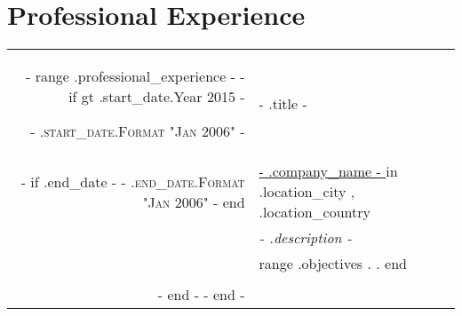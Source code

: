 \section{Professional Experience}
\begin{tabular}{r|p{15cm}}
    {{- range .professional_experience -}}
    {{- if gt .start_date.Year 2015 -}}

    \textsc{ {{- .start_date.Format "Jan 2006" -}} }                             & {{- .title -}}                                                                                          \\
    {{- if .end_date -}}\textsc{ {{- .end_date.Format "Jan 2006" -}} } {{ end }} & \href{ {{- .company_url -}} }{ {{- .company_name -}} } in {{ .location_city }}, {{ .location_country }} \\
                                                                                 & \emph{ {{- .description -}} }                                                                           \\
                                                                                 & \footnotesize{ {{ range .objectives }} {{ . }}. {{ end }} }                                             \\
    \multicolumn{2}{c}{}                                                                                                                                                                   \\

    {{- end -}}
    {{- end -}}
\end{tabular}

